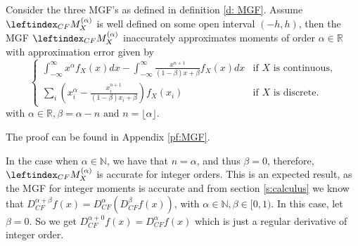 \begin{theorem}\label{t: MGF_inaccurate}
    Consider the three MGF's as defined in definition \ref{d: MGF}. Assume \(\leftindex_{CF}{M}_X^{(\alpha)}\) is well defined on some open interval \((-h, h)\), then the MGF \(\leftindex_{CF}{M}_X^{(\alpha)}\) inaccurately approximates moments of order \(\alpha \in \mathbb{R}\) with approximation error given by
    \[
\begin{cases} 
    \displaystyle \int_{-\infty}^{\infty} x^\alpha  f_X(x) dx -  \displaystyle \int_{-\infty}^{\infty}  \frac{x^{n+1} }{(1 - \beta)x + \beta} f_X(x) dx & \text{if } X \text{ is continuous,} \\ 
    \displaystyle \sum_{i} \left(x_i^\alpha -  \frac{x_i^{n+1} }{(1 - \beta)x_i + \beta}\right) f_X(x_i) & \text{if } X \text{ is discrete.} 
\end{cases}
\] with \(\alpha \in \mathbb{R}, \beta = \alpha - n \text{ and } n = \lfloor \alpha \rfloor.\)
    
\end{theorem}
The proof can be found in Appendix \ref{pf:MGF}.

\begin{remark}
    In the case when \(\alpha \in \mathbb{N}\), we have that \(n = \alpha\), and thus \( \beta = 0\), therefore, \(\leftindex_{CF}{M}_X^{(\alpha)}\) is accurate for integer orders. This is an expected result, as the MGF for integer moments is accurate and from section \ref{s:calculus} we know that \(D_{CF}^{\alpha + \beta}f(x) = D_{CF}^\alpha(D_{CF}^\beta f(x))\), with \(\alpha \in \mathbb{N}, \beta \in [0, 1).\) In this case, let \(\beta = 0\). So we get \(D_{CF}^{\alpha + 0}f(x) = D_{CF}^{\alpha}f(x)\) which is just a regular derivative of integer order.
\end{remark}
